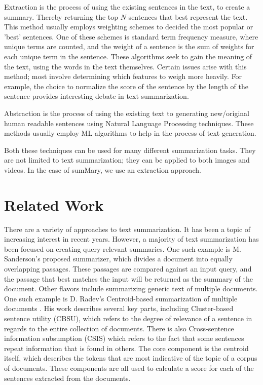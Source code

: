 \documentclass[11pt,a4paper]{article}
\begin{document}
  Extraction is the process of using the existing sentences in the text, to create a summary. Thereby returning the top $N$ sentences that best represent the text. This method usually employs weighting schemes to decided the most popular or 'best' sentences. One of these schemes is standard term frequency measure, where unique terms are counted, and the weight of a sentence is the sum of weights for each unique term in the sentence. These algorithms seek to gain the meaning of the text, using the words in the text themselves. Certain issues arise with this method; most involve determining which features to weigh more heavily. For example, the choice to normalize the score of the sentence by the length of the sentence provides interesting debate in text summarization.

  Abstraction is the process of using the existing text to generating new/original human readable sentences using Natural Language Processing techniques. These methods usually employ ML algorithms to help in the process of text generation.

  Both these techniques can be used for many different summarization tasks. They are not limited to text summarization; they can be applied to both images and videos. In the case of sumMary, we use an extraction approach.


  \section{Related Work}

  There are a variety of approaches to text summarization. It has been a topic of increasing interest in recent years. However, a majority of text summarization has been focused on creating query-relevant summaries. One such example is M. Sanderson's \cite{CIIR:00} proposed summarizer, which divides a document into equally overlapping passages. These passages are compared against an input query, and the passage that best matches the input will be returned as the summary of the document. Other flavors include summarizing generic text of multiple documents. One such example is D. Radev's Centroid-based summarization of multiple documents \cite{DHM:99}. His work describes several key parts, including Cluster-based sentence utility (CBSU), which refers to the degree of relevance of a sentence in regards to the entire collection of documents. There is also Cross-sentence information subsumption (CSIS) which refers to the fact that some sentences repeat information that is found in others. The core component is the centroid itself, which describes the tokens that are most indicative of the topic of a corpus of documents. These components are all used to calculate a score for each of the sentences extracted from the documents.
\end{document}
